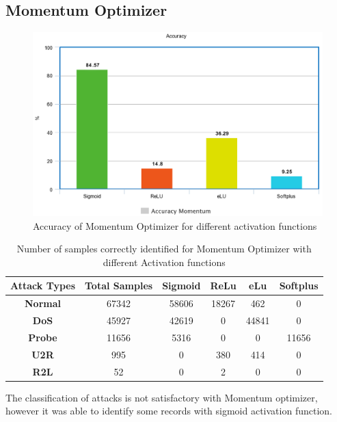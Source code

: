 \documentclass[12pt, a4paper]{report}
\begin{document}
\subsection {Momentum Optimizer}
\begin{figure}[ht]
\centering
\captionsetup{justification=centering,margin=2cm}
\includegraphics[width=13cm]{accuracy_momentum_greedy.png}
\caption{ Accuracy of Momentum Optimizer for different activation functions}
\label{fig:accuracy_mom_greedy}
\end{figure}

\begin{table}[ht]
\centering
\captionsetup{justification=centering,margin=2cm}
\begin{tabular}{|c|c|c|c|c|c|}
\hline
\textbf{Attack Types} & \textbf{Total Samples} & \textbf{Sigmoid} & \textbf{ReLu} & \textbf{eLu} & \textbf{Softplus} \\ \hline
\textbf{Normal}       & 67342                  & 58606                           & 18267         & 462                           & 0             \\ \hline
\textbf{DoS}          & 45927                  & 42619          		       & 0                 &44841         			  & 0             \\ \hline
\textbf{Probe}        & 11656                  & 5316           			      & 0                  & 0        		 			& 11656            \\ \hline
\textbf{U2R}          & 995                      & 0             		      & 380           	 & 414                			  & 0               \\ \hline
\textbf{R2L}          & 52                          & 0               		            & 2            	 & 0           		            & 0                \\ \hline
\end{tabular}
\caption{Number of samples correctly identified for Momentum Optimizer with different Activation functions}
\label{confusion_mom}
\end{table}
The classification of attacks is not satisfactory with Momentum optimizer, however it was able to identify some records with sigmoid activation function.\\ \par
\end{document}
